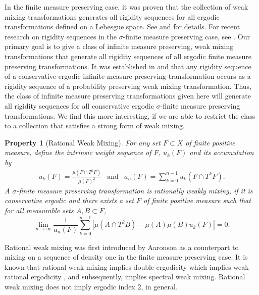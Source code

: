 \documentclass[12pt]{amsart}
\newtheorem{property}[theorem]{Property}
\begin{document}
In the finite measure preserving case, it was proven that 
the collection of weak mixing transformations generates all rigidity 
sequences for all ergodic transformations defined on a Lebesgue space. 
See \cite{Towerplex1} and \cite{FayTho14} for details. 
For recent research on rigidity sequences 
in the $\sigma$-finite measure preserving case, 
see \cite{BayYan14,BdJLR,EisGri,Roy09,Roy12,Towerplex1}. 
Our primary goal is to give a class of infinite measure preserving, 
weak mixing transformations that generate all rigidity sequences of all 
ergodic finite measure preserving transformations. 
It was established in \cite{Roy09} and \cite{Roy12} 
that any rigidity sequence 
of a conservative ergodic infinite measure preserving transformation 
occurs as a rigidity sequence of a probability preserving weak mixing 
transformation. 
Thus, the class of infinite measure preserving transformations 
given here will generate all rigidity sequences for all 
conservative ergodic $\sigma$-finite measure preserving transformations. 
We find this more interesting, if we are able to restrict the class 
to a collection that satisfies a strong form of weak mixing. 

\begin{property}[Rational Weak Mixing] 
For any set $F\subset X$ of finite positive measure, 
define the intrinsic weight sequence 
of $F$, $u_k(F)$ and its accumulation by 
\begin{eqnarray}
u_k(F) = \frac{\mu(F\cap T^kF)}{\mu(F)^2} &\mbox{and}& a_n(F) = \sum_{k=0}^{n-1} u_k(F\cap T^kF) .
\end{eqnarray}
A $\sigma$-finite measure preserving transformation is rationally weakly mixing, 
if it is conservative ergodic and there exists a set $F$ of finite positive measure 
such that for all measurable sets $A,B \subset F$, 
\[
\lim_{n\to \infty} \frac{1}{a_n(F)} \sum_{k=0}^{n-1} | \mu(A\cap T^kB) - \mu(A)\mu(B)u_k(F) | = 0.
\]
\end{property}
Rational weak mixing was first introduced by Aaronson \cite{Aa77} 
as a counterpart to mixing on a sequence of density one 
in the finite measure preserving case. 
It is known that rational weak mixing implies double ergodicity 
which implies weak rational ergodicity \cite{Aa77}, 
and subsequently, implies spectral weak mixing. 
Rational weak mixing does not imply ergodic index 2, in general. 
\end{document}
